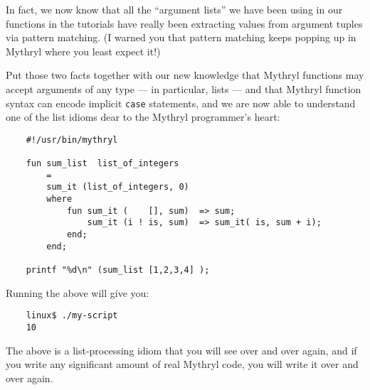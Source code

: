 In fact, we now know that all the ``argument lists'' 
we have been using in our functions in the tutorials have really 
been extracting values from argument tuples via pattern 
matching.  (I warned you that pattern matching keeps popping up in 
Mythryl where you least expect it!)

Put those two facts together with our new knowledge that 
Mythryl functions may accept arguments of any type --- in particular, 
lists --- and that Mythryl function syntax can encode implicit 
{\tt case} statements, and we are now able to understand one of 
the list idioms dear to the Mythryl programmer's heart:

\begin{verbatim}
    #!/usr/bin/mythryl

    fun sum_list  list_of_integers
        =
        sum_it (list_of_integers, 0)
        where
            fun sum_it (    [], sum)  => sum;
                sum_it (i ! is, sum)  => sum_it( is, sum + i);
            end;
        end;

    printf "%d\n" (sum_list [1,2,3,4] );
\end{verbatim}

Running the above will give you:

\begin{verbatim}
    linux$ ./my-script
    10
\end{verbatim}

The above is a list-processing idiom that you will see over and over again, 
and if you write any significant amount of real Mythryl code, you will 
write it over and over again.

